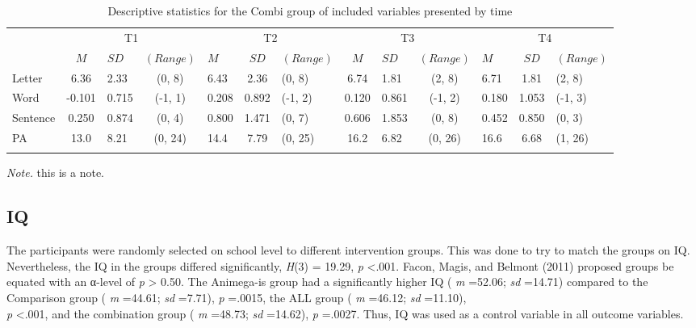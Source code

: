 \documentclass[
  english,
  ,man]{apa6}
\begin{document}
\begin{table}[tbp]

\begin{center}
\begin{threeparttable}

\caption{\label{tab:desc-read-combi-table}Descriptive statistics for the Combi group of included variables presented by time}

\small{

\begin{tabular}{lclclclclclcl}
\toprule
 & \multicolumn{3}{c}{T1} & \multicolumn{3}{c}{T2} & \multicolumn{3}{c}{T3} & \multicolumn{3}{c}{T4} \\
\cmidrule(r){2-4} \cmidrule(r){5-7} \cmidrule(r){8-10} \cmidrule(r){11-13}
  & $M$ & $SD$ & $(Range)$ & $M$ & $SD$ & $(Range)$ & $M$ & $SD$ & $(Range)$ & $M$ & $SD$ & $(Range)$\\
\midrule
Letter & 6.36 & 2.33 & (0, 8) & 6.43 & 2.36 & (0, 8) & 6.74 & 1.81 & (2, 8) & 6.71 & 1.81 & (2, 8)\\
Word & -0.101 & 0.715 & (-1, 1) & 0.208 & 0.892 & (-1, 2) & 0.120 & 0.861 & (-1, 2) & 0.180 & 1.053 & (-1, 3)\\
Sentence & 0.250 & 0.874 & (0, 4) & 0.800 & 1.471 & (0, 7) & 0.606 & 1.853 & (0, 8) & 0.452 & 0.850 & (0, 3)\\
PA & 13.0 & 8.21 & (0, 24) & 14.4 & 7.79 & (0, 25) & 16.2 & 6.82 & (0, 26) & 16.6 & 6.68 & (1, 26)\\
\bottomrule
\addlinespace
\end{tabular}

}

\begin{tablenotes}[para]
\normalsize{\textit{Note.} this is a note.}
\end{tablenotes}

\end{threeparttable}
\end{center}

\end{table}

\hypertarget{iq}{%
\subsection{IQ}\label{iq}}

The participants were randomly selected on school level to different intervention groups. This was done to try to match the groups on IQ. Nevertheless, the IQ in the groups differed significantly, \emph{H}(3) = 19.29, \emph{p} \textless.001.
Facon, Magis, and Belmont (2011) proposed groups be equated with an α-level of \emph{p} \textgreater{} 0.50. The Animega-is group had a significantly higher IQ (
\emph{m} =52.06;
\emph{sd} =14.71) compared to the Comparison group (
\emph{m} =44.61;
\emph{sd} =7.71),
\emph{p} =.0015, the ALL group (
\emph{m} =46.12;
\emph{sd} =11.10),\\
\emph{p} \textless.001, and the combination group (
\emph{m} =48.73;
\emph{sd} =14.62),
\emph{p} =.0027. Thus, IQ was used as a control variable in all outcome variables.
\end{document}
